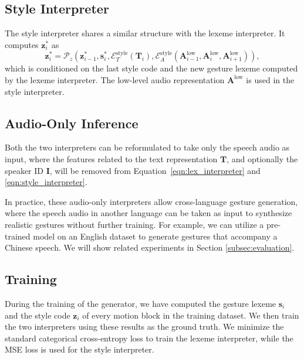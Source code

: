 \documentclass[acmtog,authorversion]{acmart}
\newcommand{\vect}[1]{\bm{#1}}
\newcommand{\eqword}[1]{{\text{#1}}}
\newcommand{\eqn}{Equation{}~}
\begin{document}
\subsection{Style Interpreter}
The style interpreter shares a similar structure with the lexeme interpreter. It computes $\vect{z}_{i}^*$ as
\begin{equation}
    {\vect{z}}_{i}^{*} = \mathcal{P}_z\left(
        \vect{z}_{i-1}^*,
        \vect{s}_{i}^*,
        \mathcal{E}_T^{\eqword{style}}\left(\vect{T}_i\right), 
        \mathcal{E}_A^{\eqword{style}}\left(\vect{A}^{\eqword{low}}_{i-1},\vect{A}^{\eqword{low}}_{i},\vect{A}^{\eqword{low}}_{i+1}\right)
        \right),
    \label{eqn:style_interpreter}
\end{equation}
which is conditioned on the last style code and the new gesture lexeme computed by the lexeme interpreter. The low-level audio representation $\vect{A}^{\eqword{low}}$ is used in the style interpreter.

\subsection{Audio-Only Inference}
\label{subsec:inference_based_on_audio_only}
Both the two interpreters can be reformulated to take only the speech audio as input, where the features related to the text representation $\vect{T}$, and optionally the speaker ID $\vect{I}$, will be removed from \eqn\eqref{eqn:lex_interpreter} and \eqref{eqn:style_interpreter}.

In practice, these audio-only interpreters allow cross-language gesture generation, where the speech audio in another language can be taken as input to synthesize realistic gestures without further training. For example, we can utilize a pre-trained model on an English dataset to generate gestures that accompany a Chinese speech. We will show related experiments in Section \ref{subsec:evaluation}.

\subsection{Training}
During the training of the generator, we have computed the gesture lexeme $\vect{s}_i$ and the style code $\vect{z}_i$ of every motion block in the training dataset. We then train the two interpreters using these results as the ground truth. We minimize the standard categorical cross-entropy loss to train the lexeme interpreter, while the MSE loss is used for the style interpreter.
\end{document}
